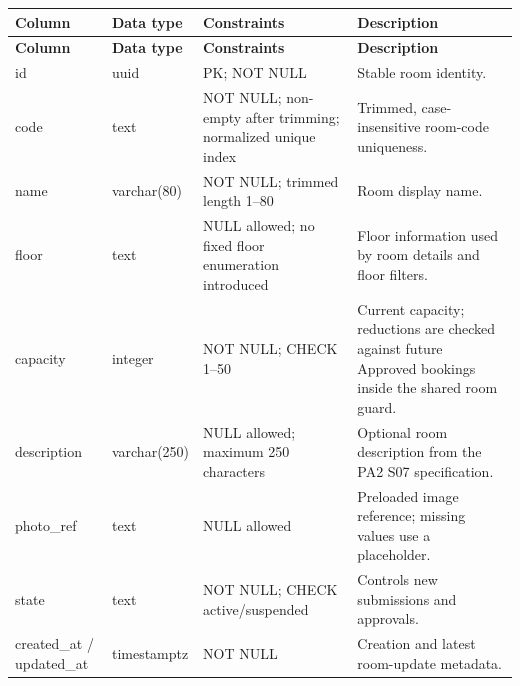 \begin{longtable}{|p{}|p{}|p{}|p{}|}

\hline

\textbf{Column} & \textbf{Data type} & \textbf{Constraints} & \textbf{Description} \\ \hline

\endfirsthead

\hline

\textbf{Column} & \textbf{Data type} & \textbf{Constraints} & \textbf{Description} \\ \hline

\endhead

id & uuid & PK; NOT NULL & Stable room identity. \\ \hline

code & text & NOT NULL; non-empty after trimming; normalized unique index & Trimmed, case-insensitive room-code uniqueness. \\ \hline

name & varchar(80) & NOT NULL; trimmed length 1–80 & Room display name. \\ \hline

floor & text & NULL allowed; no fixed floor enumeration introduced & Floor information used by room details and floor filters. \\ \hline

capacity & integer & NOT NULL; CHECK 1–50 & Current capacity; reductions are checked against future Approved bookings inside the shared room guard. \\ \hline

description & varchar(250) & NULL allowed; maximum 250 characters & Optional room description from the PA2 S07 specification. \\ \hline

photo\allowbreak\_\allowbreak{}ref & text & NULL allowed & Preloaded image reference; missing values use a placeholder. \\ \hline

state & text & NOT NULL; CHECK active/\allowbreak{}suspended & Controls new submissions and approvals. \\ \hline

created\allowbreak\_\allowbreak{}at /\allowbreak{} updated\allowbreak\_\allowbreak{}at & timestamptz & NOT NULL & Creation and latest room-update metadata. \\ \hline

\end{longtable}


